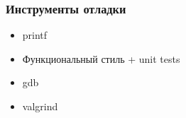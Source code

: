 \begin{frame}
  \frametitle{Инструменты отладки}
  \begin{itemize}
   \item printf
   \item Функциональный стиль + unit tests
   \item gdb
   \item valgrind
  \end{itemize}
\end{frame}
